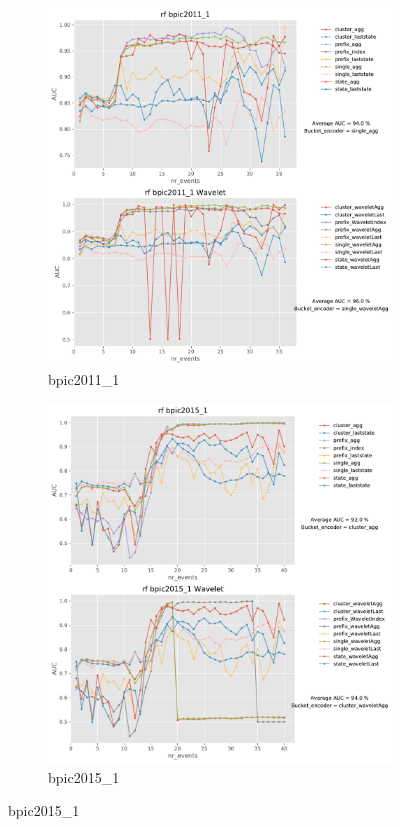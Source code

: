 \documentclass[twoside,11pt]{Latex/Classes/PhDthesisPSnPDF}
\begin{document}
\begin{figure}[!htbp] %

	\begin{subfigure}{0.48\textwidth}
		\includegraphics[width=\linewidth]{images/wavelet/graphs2rf/bpic2011_1.pdf}
		\caption{bpic2011\_1} 
	\end{subfigure}\hspace*{\fill}
	\begin{subfigure}{0.48\textwidth}
		\includegraphics[width=\linewidth]{images/wavelet/graphs2rf/bpic2015_1.pdf}
		\caption{bpic2015\_1}
	\end{subfigure}
	

\end{figure}
\end{document}
